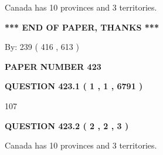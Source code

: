 \documentclass[12pt]{article}
\begin{document}
 
Canada has 10  provinces and 3 territories.
 
 
 
 
   
   
 \vspace{0.2in}
 
   
   
   
   
\vspace{1.0in} 
{\textbf{\large{ *** END OF PAPER, THANKS *** }}} 
   
   
\hspace{1.0in} By: 
 239 ( 416 ,  613 )
   
   
   
   
\newpage 
\setcounter{page}{ 
   423001 } 
   
   
   
   
 {\textbf{ \Large{ PAPER NUMBER  423  }}}
   
   
\vspace{0.2in}
   
   
   
   
   
   
 \vspace{0.2in}
 
 
 
 
   
   
  
\vspace{0.2in}
  
{\textbf{\Large{QUESTION
423.1 
 ( 1 , 1 , 6791 )
}}}
  
  
 
 
\noindent{}

107
 
 
  
\vspace{0.2in}
  
{\textbf{\Large{QUESTION
423.2 
 ( 2 , 2 , 3 )
}}}
  
  
 
 
\noindent{}
 
 
Canada has 10  provinces and 3 territories.
 
 
 
 
   
   
 \vspace{0.2in}
 
\end{document}
